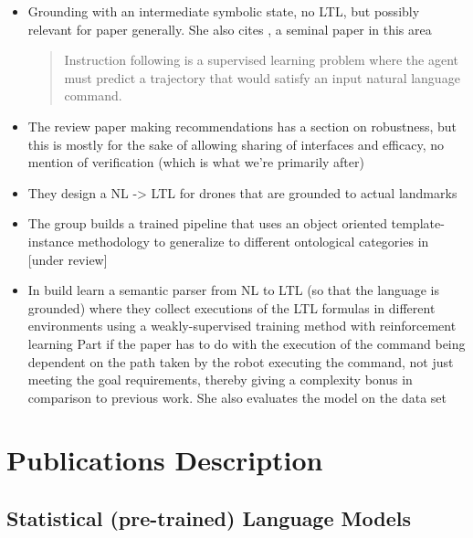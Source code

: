 \documentclass[a4paper, 11pt]{article}
\begin{document}
\begin{itemize}

\item Grounding with an intermediate symbolic state, no LTL, but possibly
  relevant for paper generally. She also cites \cite{walkTalk}, a seminal paper in this area
\begin{quote}
Instruction following is a supervised learning problem
where the agent must predict a trajectory that would satisfy an
input natural language command. \cite{tellexInstr}
\end{quote}
\item The review paper \cite{MARGE2022101255} making recommendations has a
  section on robustness, but this is mostly for the sake of allowing sharing of
  interfaces and efficacy, no mention of verification (which is what we're
  primarily after)
\item They design a NL -> LTL for drones that are grounded to actual landmarks \cite{9197068}
\item The group builds a trained pipeline that uses an object oriented
  template-instance methodology to generalize to different ontological
  categories in  \cite{hsiung2021generalizing} [under review]

\item In \cite{patellearning} build learn a semantic parser from NL to LTL (so
that the language is grounded) where they collect executions of the LTL formulas
in different environments using a weakly-supervised training method with
reinforcement learning Part if the paper has to do with the execution of the
command being dependent on the path taken by the robot executing the command,
not just meeting the goal requirements, thereby giving a complexity bonus in
comparison to previous work. She also evaluates the model on the \cite{walkTalk}
data set
\end{itemize}

\section{Publications Description}

\subsection{Statistical (pre-trained) Language Models}
\end{document}
